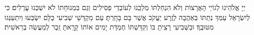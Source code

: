 \veshameru

יְיָ אֱלֹהֵינוּ לְגוֹיֵי הָאֲרָצוֹת וְלֹא הִנְחַלְתּוֹ מַלְכֵּֽנוּ לְעוֹבְדֵי פְסִילִים וְגַם בִּמְנוּחָתוֹ לֹא יִשְׁכְּנוּ עֲרֵלִים׃ כִּי לְיִשְׂרָאֵל עַמְּךָ נְתַתּוֹ בְּאַהֲבָה לְזֶֽרַע יַעֲקֹב אֲשֶׁר בָּם בָּחָֽרְתָּ׃ עַם מְקַדְּשֵׁי שְׁבִיעִי כֻּלָּם יִשְׂבְּעוּ וְיִתְעַנְּגוּ מִטּוּבֶֽךָ׃ וּבַשְּׁבִיעִי רָצִֽיתָ בּוֹ וְקִדַּשְׁתּוֹ חֶמְדַּת יָמִים אוֹתוֹ קָרָֽאתָ זֵֽכֶר לְמַעֲשֵׂה בְרֵאשִׁית׃

\shabboskiddushhayom{}

%
%
%
%
%
%
%
%
%

\retzeh

\yaalehveyavo

\zion

\modim



\shabbossimshalom

